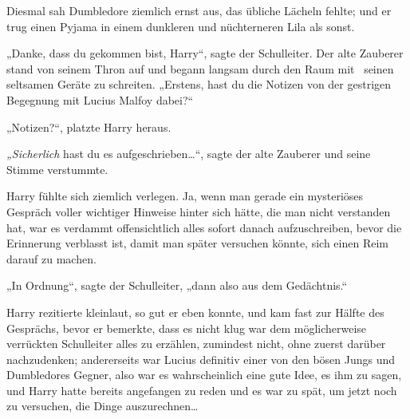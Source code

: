 Diesmal sah Dumbledore ziemlich ernst aus, das übliche Lächeln fehlte; und er trug einen Pyjama in einem dunkleren und nüchterneren Lila als sonst.

„Danke, dass du gekommen bist, Harry“, sagte der Schulleiter. Der alte Zauberer stand von seinem Thron auf und begann langsam durch den Raum mit ~seinen seltsamen Geräte zu schreiten. „Erstens, hast du die Notizen von der gestrigen Begegnung mit Lucius Malfoy dabei?“

„Notizen?“, platzte Harry heraus.

\emph{„Sicherlich} hast du es aufgeschrieben…“, sagte der alte Zauberer und seine Stimme verstummte.

Harry fühlte sich ziemlich verlegen. Ja, wenn man gerade ein mysteriöses Gespräch voller wichtiger Hinweise hinter sich hätte, die man nicht verstanden hat, war es verdammt offensichtlich alles sofort danach aufzuschreiben, bevor die Erinnerung verblasst ist, damit man später versuchen könnte, sich einen Reim darauf zu machen.

„In Ordnung“, sagte der Schulleiter, „dann also aus dem Gedächtnis.“

Harry rezitierte kleinlaut, so gut er eben konnte, und kam fast zur Hälfte des Gesprächs, bevor er bemerkte, dass es nicht klug war dem möglicherweise verrückten Schulleiter alles zu erzählen, zumindest nicht, ohne zuerst darüber nachzudenken; andererseits war Lucius definitiv einer von den bösen Jungs und Dumbledores Gegner, also war es wahrscheinlich eine gute Idee, es ihm zu sagen, und Harry hatte bereits angefangen zu reden und es war zu spät, um jetzt noch zu versuchen, die Dinge auszurechnen…

